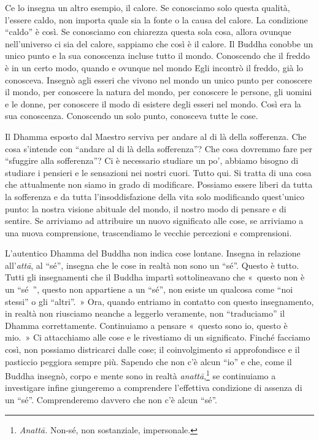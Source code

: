 Ce lo insegna un altro esempio, il calore. Se conosciamo solo questa
qualità, l'essere caldo, non importa quale sia la fonte o la causa del
calore. La condizione ``caldo'' è così. Se conosciamo con chiarezza
questa sola cosa, allora ovunque nell'universo ci sia del calore,
sappiamo che così è il calore. Il Buddha conobbe un unico punto e la sua
conoscenza incluse tutto il mondo. Conoscendo che il freddo è in un
certo modo, quando e ovunque nel mondo Egli incontrò il freddo, già lo
conosceva. Insegnò agli esseri che vivono nel mondo un unico punto per
conoscere il mondo, per conoscere la natura del mondo, per conoscere le
persone, gli uomini e le donne, per conoscere il modo di esistere degli
esseri nel mondo. Così era la sua conoscenza. Conoscendo un solo punto,
conosceva tutte le cose.

Il Dhamma esposto dal Maestro serviva per andare al di là della
sofferenza. Che cosa s'intende con ``andare al di là della sofferenza''?
Che cosa dovremmo fare per ``sfuggire alla sofferenza''? Ci è necessario
studiare un po', abbiamo bisogno di studiare i pensieri e le sensazioni
nei nostri cuori. Tutto qui. Si tratta di una cosa che attualmente non
siamo in grado di modificare. Possiamo essere liberi da tutta la
sofferenza e da tutta l'insoddisfazione della vita solo modificando
quest'unico punto: la nostra visione abituale del mondo, il nostro modo
di pensare e di sentire. Se arriviamo ad attribuire un nuovo significato
alle cose, se arriviamo a una nuova comprensione, trascendiamo le
vecchie percezioni e comprensioni.

L'autentico Dhamma del Buddha non indica cose lontane. Insegna in
relazione all'\emph{attā}, al ``sé'', insegna che le cose in realtà non
sono un ``sé''. Questo è tutto. Tutti gli insegnamenti che il Buddha
impartì sottolineavano che «~questo non è un ``sé~'', questo non
appartiene a un ``sé'', non esiste un qualcosa come ``noi stessi'' o gli
``altri''.~» Ora, quando entriamo in contatto con questo insegnamento,
in realtà non riusciamo neanche a leggerlo veramente, non ``traduciamo''
il Dhamma correttamente. Continuiamo a pensare «~questo sono io, questo
è mio.~» Ci attacchiamo alle cose e le rivestiamo di un significato.
Finché facciamo così, non possiamo districarci dalle cose; il
coinvolgimento si approfondisce e il pasticcio peggiora sempre più.
Sapendo che non c'è alcun ``io'' e che, come il Buddha insegnò, corpo e
mente sono in realtà \emph{anattā},\footnote{\emph{Anattā.} Non-sé, non
  sostanziale, impersonale.} se continuiamo a investigare infine
giungeremo a comprendere l'effettiva condizione di assenza di un ``sé''.
Comprenderemo davvero che non c'è alcun ``sé''.

